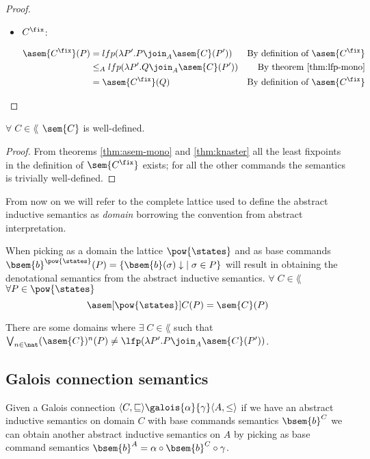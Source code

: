 \begin{proof}
\begin{itemize}
    \item $C^\fix$:

      \begin{align*}
        \asem{C^\fix}(P) 
          &= lfp(\lambda P'. P \join_A \asem{C}(P'))
          &\text{By definition of $\asem{C^\fix}$}\\
          &\leq_A lfp(\lambda P'. Q \join_A \asem{C}(P'))
          &\text{By theorem \ref{thm:lfp-mono}}\\
          &= \asem{C^\fix}(Q) 
          &\text{By definition of $\asem{C^\fix}$}\\
      \end{align*}

  \end{itemize}

\end{proof}


\begin{lemma}
  $\forall \; C \in \lang$ $\sem{C}$ is well-defined.
\end{lemma}
\begin{proof}
  From theorems \ref{thm:asem-mono} and 
  \ref{thm:knaster} all the least fixpoints in the definition of 
  $\sem{C^\fix}$ exists; for all the other commands the semantics is 
  trivially well-defined.
\end{proof}

From now on we will refer to the complete lattice used to define the abstract
inductive semantics as \textit{domain} borrowing the convention from abstract
interpretation.

\begin{observation}
  When picking as a domain the lattice $\pow{\states}$ and as base commands
  $\bsem{b}^{\pow{\states}}(P) = \{ \bsem{b}(\sigma)\downarrow \; \mid \sigma 
  \in P \}$ will result in obtaining the denotational semantics from the 
  abstract inductive semantics. $\forall \; C \in \lang$ $\forall P \in 
  \pow{\states}$ 
  $$\asem[\pow{\states}]{C}(P) = \sem{C}(P)$$
\end{observation}

\begin{observation}
  \label{obs:abstract-fix}
  There are some domains where $\exists \; C \in \lang$ such that
  $\bigvee_{n \in \nat} (\asem{C})^n(P) \neq \lfp(\lambda P'. P \join_A
  \asem{C}(P'))$.
\end{observation}

\subsection{Galois connection semantics}
  Given a Galois connection $\langle C, \sqsubseteq \rangle
  \galois{\alpha}{\gamma} \langle A, \leq \rangle$ if we have an abstract 
  inductive semantics on domain $C$ with base commands semantics $\bsem{b}^C$
  we can obtain another abstract inductive semantics on $A$ by picking as
  base command semantics $\bsem{b}^A = \alpha \circ \bsem{b}^C \circ \gamma$.


